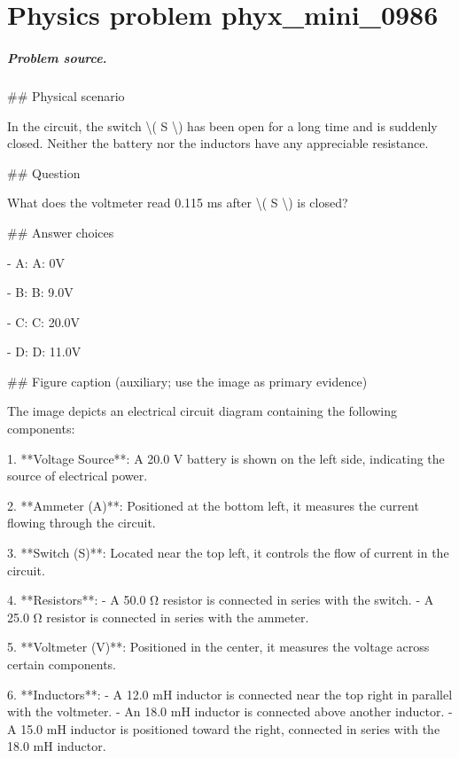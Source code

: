 
\chapter{Physics problem phyx\_mini\_0986}
\label{ch:PhyXMiniProblems_problem_phyx_mini_0986}

\paragraph{Problem source.}
\#\# Physical scenario

In the circuit, the switch \textbackslash{}( S \textbackslash{}) has been open for a long time and is suddenly closed. Neither the battery nor the inductors have any appreciable resistance.

\#\# Question

What does the voltmeter read 0.115 ms after \textbackslash{}( S \textbackslash{}) is closed?

\#\# Answer choices

- A: A: 0V

- B: B: 9.0V

- C: C: 20.0V

- D: D: 11.0V

\#\# Figure caption (auxiliary; use the image as primary evidence)

The image depicts an electrical circuit diagram containing the following components:

1. **Voltage Source**: A 20.0 V battery is shown on the left side, indicating the source of electrical power.

2. **Ammeter (A)**: Positioned at the bottom left, it measures the current flowing through the circuit.

3. **Switch (S)**: Located near the top left, it controls the flow of current in the circuit.

4. **Resistors**:
   - A 50.0 Ω resistor is connected in series with the switch.
   - A 25.0 Ω resistor is connected in series with the ammeter.

5. **Voltmeter (V)**: Positioned in the center, it measures the voltage across certain components.

6. **Inductors**:
   - A 12.0 mH inductor is connected near the top right in parallel with the voltmeter.
   - An 18.0 mH inductor is connected above another inductor.
   - A 15.0 mH inductor is positioned toward the right, connected in series with the 18.0 mH inductor.

